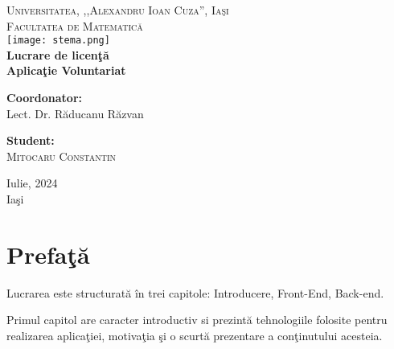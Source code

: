 \documentclass[11pt,a4paper]{report}
\begin{document}
\begin{titlepage}
    \begin{center}
        \large
        \textsc{Universitatea, ,,Alexandru Ioan Cuza'', Ia\c si}\\
        \textsc{Facultatea de Matematic\u a}\\[0.3cm]
        \texttt{[image: stema.png]}\\[5 cm]
        \Huge
        \textbf{Lucrare de licen\c t\u a}\\[0.5cm]
        \textbf{Aplica\c tie Voluntariat}\\[0.5cm]
        \vfill
        \vfill
        \begin{minipage}[t]{0.49\textwidth}
        \begin{flushleft}
            \large
            \textbf{Coordonator:}\\
            Lect. Dr. R\u aducanu R\u azvan
        \end{flushleft}
        \end{minipage}
        \hfill
        \begin{minipage}[t]{0.49\textwidth}
        \begin{flushright}
            \large
            \textbf{Student:}\\
            \textsc{Mitocaru Constantin}\\
        \end{flushright}
        \end{minipage}
        \vfill
        \large
        \centering
        Iulie, 2024\\
        Ia\c si
    \end{center}
\end{titlepage}

\pagestyle{fancy}
\tableofcontents
\fancyhf{}
\clearpage
\chapter*{Prefa\c t\u a}
\hspace{1.4em} Lucrarea este structurat\u a \^ in trei capitole: Introducere, Front-End, Back-end.
\par Primul capitol are caracter introductiv si prezint\u a tehnologiile folosite pentru realizarea aplica\c tiei, motiva\c tia \c si o scurt\u a prezentare a con\c tinutului acesteia.
\end{document}
